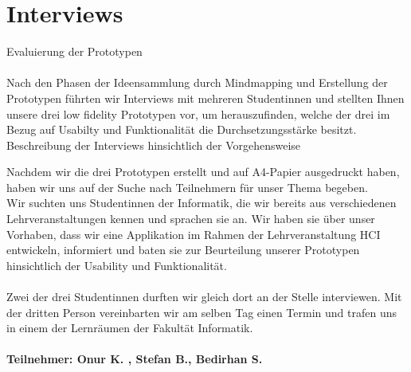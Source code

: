 \documentclass[runningheads,a4paper]{llncs}
\begin{document}
\clearpage



\section{Interviews}

Evaluierung der Prototypen\\\\
Nach den Phasen der Ideensammlung durch Mindmapping und Erstellung der Prototypen führten wir Interviews mit mehreren Studentinnen und stellten Ihnen unsere drei low fidelity Prototypen vor, um herauszufinden, welche der  drei im Bezug auf Usabilty und Funktionalität die Durchsetzungsstärke besitzt. 
\\
Beschreibung der Interviews hinsichtlich der Vorgehensweise

\begin{figure}
\centering
{}
\end{figure}


Nachdem wir die drei Prototypen erstellt und auf A4-Papier ausgedruckt haben, haben wir uns auf der Suche nach Teilnehmern für unser Thema begeben. \\Wir suchten uns Studentinnen der Informatik, die wir bereits aus verschiedenen Lehrveranstaltungen kennen  und sprachen sie an.  Wir haben sie über unser Vorhaben, dass wir eine Applikation im Rahmen der Lehrveranstaltung HCI entwickeln, informiert und baten sie zur Beurteilung unserer Prototypen hinsichtlich der Usability und Funktionalität.\\\\ Zwei der drei Studentinnen durften wir gleich dort an der Stelle interviewen. Mit der dritten Person vereinbarten wir am selben Tag einen Termin und trafen uns in einem der Lernräumen der Fakultät Informatik.\\\\
\clearpage
\textbf {Teilnehmer: Onur K. , Stefan B., Bedirhan S.}\\
\end{document}
